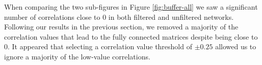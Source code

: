 When comparing the two sub-figures in Figure \ref{fig:buffer-all} we saw a significant number of correlations close to 0 in both filtered and unfiltered networks. Following our results in the previous section, we removed a majority of the correlation values that lead to the fully connected matrices despite being close to 0. It appeared that selecting a correlation value threshold of $\pm 0.25$ allowed us to ignore a majority of the low-value correlations.
